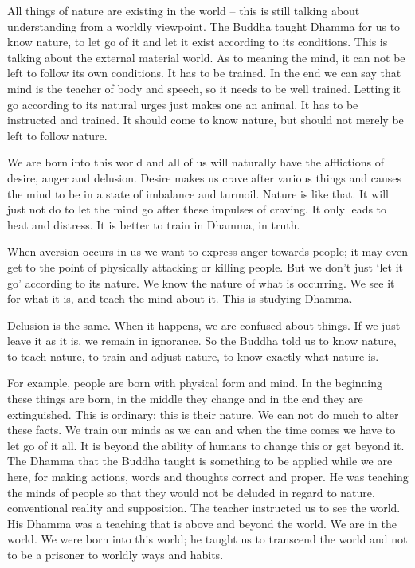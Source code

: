 All things of nature are existing in the world -- this is still talking about understanding from a worldly viewpoint. The Buddha taught Dhamma for us to know nature, to let go of it and let it exist according to its conditions. This is talking about the external material world. As to  meaning the mind, it can not be left to follow its own conditions. It has to be trained. In the end we can say that mind is the teacher of body and speech, so it needs to be well trained. Letting it go according to its natural urges just makes one an animal. It has to be instructed and trained. It should come to know nature, but should not merely be left to follow nature. 

We are born into this world and all of us will naturally have the afflictions of desire, anger and delusion. Desire makes us crave after various things and causes the mind to be in a state of imbalance and turmoil. Nature is like that. It will just not do to let the mind go after these impulses of craving. It only leads to heat and distress. It is better to train in Dhamma, in truth. 

When aversion occurs in us we want to express anger towards people; it may even get to the point of physically attacking or killing people. But we don't just `let it go' according to its nature. We know the nature of what is occurring. We see it for what it is, and teach the mind about it. This is studying Dhamma. 

Delusion is the same. When it happens, we are confused about things. If we just leave it as it is, we remain in ignorance. So the Buddha told us to know nature, to teach nature, to train and adjust nature, to know exactly what nature is. 

For example, people are born with physical form and mind. In the beginning these things are born, in the middle they change and in the end they are extinguished. This is ordinary; this is their nature. We can not do much to alter these facts. We train our minds as we can and when the time comes we have to let go of it all. It is beyond the ability of humans to change this or get beyond it. The Dhamma that the Buddha taught is something to be applied while we are here, for making actions, words and thoughts correct and proper. He was teaching the minds of people so that they would not be deluded in regard to nature, conventional reality and supposition. The teacher instructed us to see the world. His Dhamma was a teaching that is above and beyond the world. We are in the world. We were born into this world; he taught us to transcend the world and not to be a prisoner to worldly ways and habits. 

